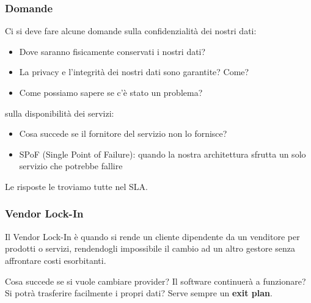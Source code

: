 \subsubsection{Domande}
Ci si deve fare alcune domande sulla confidenzialità dei nostri dati:
\begin{itemize}
	\item Dove saranno fisicamente conservati i nostri dati?
	\item La privacy e l'integrità dei nostri dati sono garantite? Come?
	\item Come possiamo sapere se c'è stato un problema?
\end{itemize}
sulla disponibilità dei servizi: 
\begin{itemize}
	\item Cosa succede se il fornitore del servizio non lo fornisce?
	\item SPoF (Single Point of Failure): quando la nostra architettura sfrutta un solo servizio che potrebbe fallire
\end{itemize}
Le risposte le troviamo tutte nel SLA.

\subsubsection{Vendor Lock-In}
\begin{definition}
	Il Vendor Lock-In è quando si rende un cliente dipendente da un venditore per prodotti o servizi, rendendogli impossibile il cambio ad un altro gestore senza affrontare costi esorbitanti.
\end{definition}
Cosa succede se si vuole cambiare provider? Il software continuerà a funzionare? Si potrà trasferire facilmente i propri dati? Serve sempre un \textbf{exit plan}.